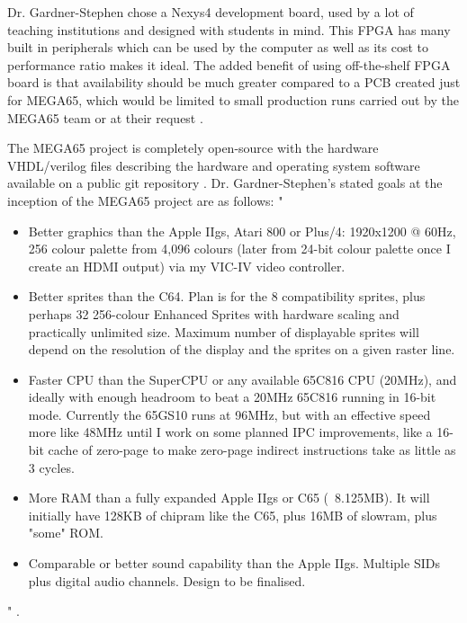 Dr. Gardner-Stephen chose a Nexys4 development board, used by a lot of teaching institutions and designed with students in mind. This FPGA has many built in peripherals which can be used by the computer as well as its cost to performance ratio makes it ideal. The added benefit of using off-the-shelf FPGA board is that availability should be much greater compared to a PCB created just for MEGA65, which would be limited to small production runs carried out by the MEGA65 team or at their request 
\cite{RN45}.

The MEGA65 project is completely open-source with the hardware VHDL/verilog files describing the hardware and operating system software available on a public git repository 
\cite{RN17}. Dr. Gardner-Stephen's stated goals at the inception of the MEGA65 project are as follows: 
" \begin{itemize}
\item Better graphics than the Apple IIgs, Atari 800 or Plus/4: 1920x1200 @ 60Hz, 256 colour palette from 4,096 colours (later from 24-bit colour palette once I create an HDMI output) via my VIC-IV video controller.
 \item    Better sprites than the C64.  Plan is for the 8 compatibility sprites, plus perhaps 32 256-colour Enhanced Sprites with hardware scaling and practically unlimited size.  Maximum number of displayable sprites will depend on the resolution of the display and the sprites on a given raster line.
 \item    Faster CPU than the SuperCPU or any available 65C816 CPU (20MHz), and ideally with enough headroom to beat a 20MHz 65C816 running in 16-bit mode.  Currently the 65GS10 runs at 96MHz, but with an effective speed more like 48MHz until I work on some planned IPC improvements, like a 16-bit cache of zero-page to make zero-page indirect instructions take as little as 3 cycles.
 \item    More RAM than a fully expanded Apple IIgs or C65 (~8.125MB).  It will initially have 128KB of chipram like the C65, plus 16MB of slowram, plus "some" ROM.
 \item    Comparable or better sound capability than the Apple IIgs.  Multiple SIDs plus digital audio channels.  Design to be finalised.
\end{itemize} " \cite{RN45}. \\\\

